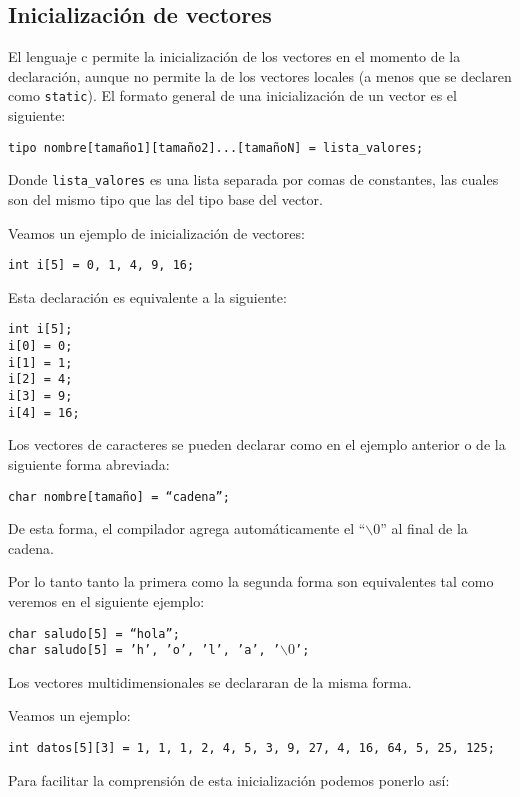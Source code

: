\subsection{Inicialización de vectores}{
El lenguaje c permite la inicialización de los vectores en el momento de la declaración, aunque no permite la de los vectores locales (a menos que se declaren como \texttt{static}). El formato general de una inicialización de un vector es el siguiente:

\texttt{tipo nombre[tamaño1][tamaño2]...[tamañoN] = {lista\_valores};}

Donde \texttt{lista\_valores} es una lista separada por comas de constantes, las cuales son del mismo tipo que las del tipo base del vector.

Veamos un ejemplo de inicialización de vectores:
\begin{Ejemplo}
\texttt{int i[5] = {0, 1, 4, 9, 16};}

Esta declaración es equivalente a la siguiente:

\texttt{int i[5];}\\
\texttt{i[0] = 0;}\\
\texttt{i[1] = 1;}\\
\texttt{i[2] = 4;}\\
\texttt{i[3] = 9;}\\
\texttt{i[4] = 16;}\\
\end{Ejemplo}
Los vectores de caracteres se pueden declarar como en el ejemplo anterior o de la siguiente forma abreviada:

\texttt{char nombre[tamaño] = ``cadena'';}

De esta forma, el compilador agrega automáticamente el ``$\backslash{0}$'' al final de la cadena.

Por lo tanto tanto la primera como la segunda forma son equivalentes tal como veremos en el siguiente ejemplo:
\begin{Ejemplo}
\texttt{char saludo[5] = {``hola''};}\\
\texttt{char saludo[5] = {'h', 'o', 'l', 'a', '$\backslash{0}$'};}\\
\end{Ejemplo}
Los vectores multidimensionales se declararan de la misma forma.

Veamos un ejemplo:
\begin{Ejemplo}
\texttt{int datos[5][3] = {1, 1, 1, 2, 4, 5, 3, 9, 27, 4, 16, 64, 5, 25, 125};}

Para facilitar la comprensión de esta inicialización podemos ponerlo así:


\end{Ejemplo}}
